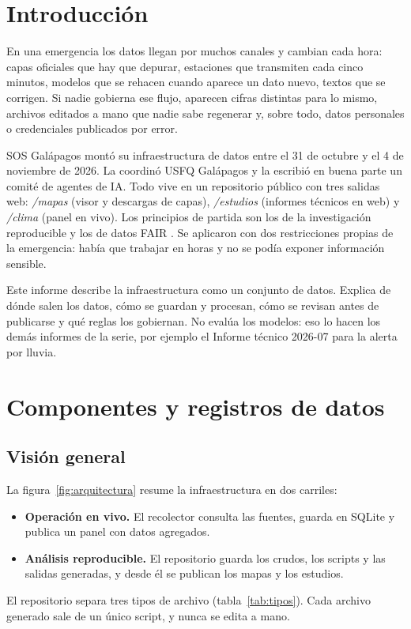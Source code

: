 \documentclass{sosg-informe}
\begin{document}
\section{Introducción}

En una emergencia los datos llegan por muchos canales y cambian cada hora: capas oficiales que hay que depurar, estaciones que transmiten cada cinco minutos, modelos que se rehacen cuando aparece un dato nuevo, textos que se corrigen. Si nadie gobierna ese flujo, aparecen cifras distintas para lo mismo, archivos editados a mano que nadie sabe regenerar y, sobre todo, datos personales o credenciales publicados por error.

SOS Galápagos montó su infraestructura de datos entre el 31 de octubre y el 4 de noviembre de 2026. La coordinó USFQ Galápagos y la escribió en buena parte un comité de agentes de IA. Todo vive en un repositorio público con tres salidas web: \emph{/mapas} (visor y descargas de capas), \emph{/estudios} (informes técnicos en web) y \emph{/clima} (panel en vivo). Los principios de partida son los de la investigación reproducible \citep{sandve2013,wilson2017} y los de datos FAIR \citep{wilkinson2016}. Se aplicaron con dos restricciones propias de la emergencia: había que trabajar en horas y no se podía exponer información sensible.

Este informe describe la infraestructura como un conjunto de datos. Explica de dónde salen los datos, cómo se guardan y procesan, cómo se revisan antes de publicarse y qué reglas los gobiernan. No evalúa los modelos: eso lo hacen los demás informes de la serie, por ejemplo el Informe técnico 2026-07 \citep{maya2026alerta} para la alerta por lluvia.

\section{Componentes y registros de datos}

\subsection{Visión general}
La figura~\ref{fig:arquitectura} resume la infraestructura en dos carriles:
\begin{itemize}
  \item \textbf{Operación en vivo.} El recolector consulta las fuentes, guarda en SQLite y publica un panel con datos agregados.
  \item \textbf{Análisis reproducible.} El repositorio guarda los crudos, los scripts y las salidas generadas, y desde él se publican los mapas y los estudios.
\end{itemize}
El repositorio separa tres tipos de archivo (tabla~\ref{tab:tipos}). Cada archivo generado sale de un único script, y nunca se edita a mano.
\end{document}
